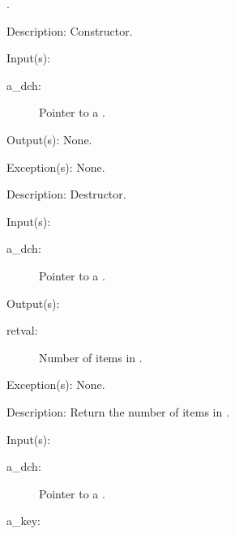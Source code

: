 \begin{capi}
\begin{capilist}
\begin{description}
		\item[.]
		\end{description}
	\item[Description: ]
		Constructor.
	\end{capilist}
\label{dch_delete}
	\begin{capilist}
	\item[Input(s): ]
		\begin{description}\item[]
		\item[a\_dch: ]
			Pointer to a .
		\end{description}
	\item[Output(s): ] None.
	\item[Exception(s): ] None.
	\item[Description: ]
		Destructor.
	\end{capilist}
\label{dch_count}
	\begin{capilist}
	\item[Input(s): ]
		\begin{description}\item[]
		\item[a\_dch: ]
			Pointer to a \classname{dch}.
		\end{description}
	\item[Output(s): ]
		\begin{description}\item[]
		\item[retval: ]
			Number of items in \cvar{a\_dch}.
		\end{description}
	\item[Exception(s): ] None.
	\item[Description: ]
		Return the number of items in \cvar{a\_dch}.
	\end{capilist}
\label{dch_insert}
	\begin{capilist}
	\item[Input(s): ]
		\begin{description}\item[]
		\item[a\_dch: ]
			Pointer to a .
		\item[a\_key: ]

\end{description}
\end{capilist}
\end{capi}
